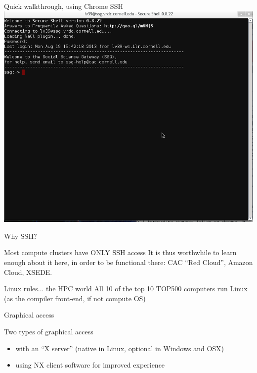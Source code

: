 \documentclass[xcolor=table,compress]{beamer}
\begin{document}
\begin{frame}{Quick walkthrough, using Chrome SSH}
\includegraphics[width=.9\textwidth]{chrome-ssh-screen3.png}
\end{frame}


\begin{frame}{Why SSH?}
\begin{block}{Most compute clusters have ONLY SSH access}
It is thus worthwhile to learn enough about it here, in order to be functional there: CAC ``Red Cloud'', Amazon Cloud, XSEDE. 
\end{block}
\begin{block}{Linux rules... the HPC world}
All 10 of the top 10 \href{http://www.top500.org/list/2013/06/}{TOP500} computers run Linux (as the compiler front-end, if not compute OS)
\end{block}
\end{frame}



\begin{frame}{Graphical access}
\begin{block}{Two types of graphical access}
\begin{itemize}[<+->]
\item with an ``X server'' (native in Linux, optional in Windows and OSX) 
\item<3-> using NX client software for improved experience
\end{itemize}
\end{block}
\end{frame}
\end{document}
